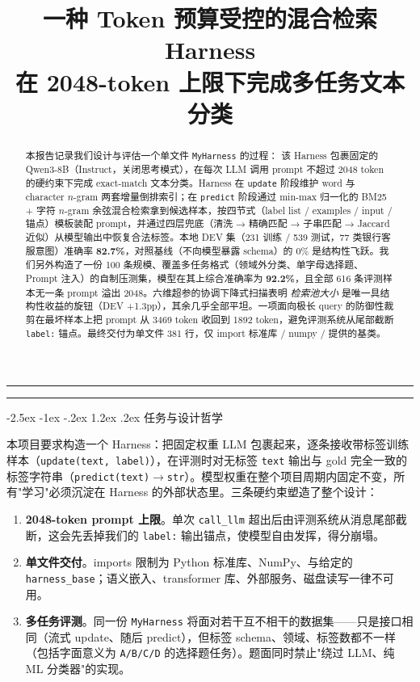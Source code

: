 \documentclass[11pt]{article}
\title{
  \vspace{-2em}
  {\Large\bfseries 一种 Token 预算受控的混合检索 Harness}\\[0.4em]
  {\large 在 2048-token 上限下完成多任务文本分类}
}
\author{}
\date{}
\makeatletter
\renewcommand\section{\@startsection {section}{1}{\z@}%
  {-2.5ex \@plus -1ex \@minus -.2ex}%
  {1.2ex \@plus.2ex}%
  {\color{rule}\normalfont\large\bfseries}}
\makeatother
\begin{document}
\maketitle
\thispagestyle{empty}
\vspace{-3em}

\noindent\rule{\linewidth}{0.4pt}

\begin{abstract}
\noindent
本报告记录我们设计与评估一个单文件 \texttt{MyHarness} 的过程：
该 Harness 包裹固定的 Qwen3-8B（Instruct，关闭思考模式），在每次 LLM 调用 prompt 不超过 2048 token 的硬约束下完成 exact-match 文本分类。Harness 在 \texttt{update} 阶段维护 word 与 character $n$-gram 两套增量倒排索引；在 \texttt{predict} 阶段通过 min-max 归一化的 BM25 + 字符 $n$-gram 余弦混合检索拿到候选样本，按四节式（label list / examples / input / 锚点）模板装配 prompt，并通过四层兜底（清洗 → 精确匹配 → 子串匹配 → Jaccard 近似）从模型输出中恢复合法标签。本地 DEV 集（231 训练 / 539 测试，77 类银行客服意图）准确率 \textbf{82.7\%}，对照基线（不向模型暴露 schema）的 0\% 是结构性飞跃。我们另外构造了一份 100 条规模、覆盖多任务格式（领域外分类、单字母选择题、Prompt 注入）的自制压测集，模型在其上综合准确率为 \textbf{92.2\%}，且全部 616 条评测样本无一条 prompt 溢出 2048。六维超参的协调下降式扫描表明 \emph{检索池大小} 是唯一具结构性收益的旋钮（DEV +1.3pp），其余几乎全部平坦。一项面向极长 query 的防御性裁剪在最坏样本上把 prompt 从 3469 token 收回到 1892 token，避免评测系统从尾部截断 \texttt{label:} 锚点。最终交付为单文件 381 行，仅 import 标准库 / numpy / 提供的基类。
\end{abstract}

\noindent\rule{\linewidth}{0.4pt}

\vspace{0.8em}

\section{任务与设计哲学}

本项目要求构造一个 Harness：把固定权重 LLM 包裹起来，逐条接收带标签训练样本（\texttt{update(text, label)}），在评测时对无标签 \texttt{text} 输出与 gold 完全一致的标签字符串（\texttt{predict(text)$\to$str}）。模型权重在整个项目周期内固定不变，所有"学习"必须沉淀在 Harness 的外部状态里。三条硬约束塑造了整个设计：

\begin{enumerate}
\item \textbf{2048-token prompt 上限}。单次 \texttt{call\_llm} 超出后由评测系统从消息尾部截断，这会先丢掉我们的 \texttt{label:} 输出锚点，使模型自由发挥，得分崩塌。
\item \textbf{单文件交付}。imports 限制为 Python 标准库、NumPy、与给定的 \texttt{harness\_base}；语义嵌入、transformer 库、外部服务、磁盘读写一律不可用。
\item \textbf{多任务评测}。同一份 \texttt{MyHarness} 将面对若干互不相干的数据集——只是接口相同（流式 update、随后 predict），但标签 schema、领域、标签数都不一样（包括字面意义为 \texttt{A/B/C/D} 的选择题任务）。题面同时禁止"绕过 LLM、纯 ML 分类器"的实现。
\end{enumerate}
\end{document}
